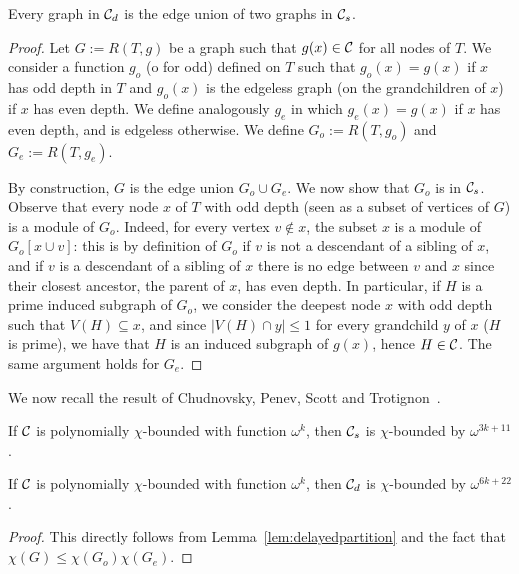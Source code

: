 \begin{lemma}\label{lem:delayedpartition}
Every graph in ${\cal C}_d$ is the edge union of two graphs in ${\cal C}_s$.
\end{lemma}
\begin{proof}
Let $G:=R(T,g)$ be a graph such that $g(x)\in \cal C$ for all nodes of $T$. We consider a function $g_o$ (o for odd)  defined on $T$ such that  $g_o(x)=g(x)$ if $x$ has odd depth in $T$ and $g_o(x)$ is the edgeless graph (on the grandchildren of $x$) if $x$ has even depth. We define analogously $g_e$ in which $g_e(x)=g(x)$ if $x$ has even depth, and is edgeless otherwise. We define $G_o:=R(T,g_o)$ and $G_e:=R(T,g_e)$.

By construction, $G$ is the edge union $G_o\cup G_e$. We now show that $G_o$ is in ${\cal C}_s$. Observe that every node $x$ of $T$ with odd depth  (seen as a subset of vertices of $G$) is a module of $G_o$. Indeed, for every vertex $v\notin x$, the subset $x$ is a module of $G_o[x\cup v]$: this is by definition of $G_o$ if $v$ is not a descendant of a sibling of $x$, and if $v$ is a descendant of a sibling of $x$ there is no edge between $v$ and $x$ since their closest ancestor, the parent of $x$, has even depth.
In particular, if $H$ is a prime induced subgraph of $G_o$, we consider the deepest node $x$ with odd depth such that $V(H)\subseteq x$, and since $|V(H)\cap y|\leq 1$ for every grandchild $y$ of $x$ ($H$ is prime), we have that $H$ is an induced subgraph of $g(x)$, hence $H\in \cal C$. The same argument holds for $G_e$.
\end{proof}

We now recall the result of Chudnovsky, Penev, Scott and Trotignon~\cite{CPST13}.

\begin{theorem}\label{th:cpst}
If $\cal C$ is polynomially $\chi$-bounded with function $\omega^k$, then ${\cal C}_s$ is $\chi$-bounded by $\omega^{3k+11}$.
\end{theorem}

\begin{corollary}\label{cor:delay}
If $\cal C$ is polynomially $\chi$-bounded with function $\omega^k$, then ${\cal C}_d$ is $\chi$-bounded by $\omega^{6k+22}$.
\end{corollary}

\begin{proof} This directly follows from Lemma~\ref{lem:delayedpartition} and the fact that $\chi (G)\leq \chi (G_o)\chi (G_e)$.
\end{proof}

